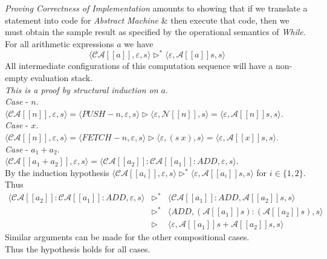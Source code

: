 \documentclass[11pt,a4paper]{article}
\begin{document}
\textit{Proving Correctness of Implementation} amounts to showing that if we translate a statement into code for \textit{Abstract Machine} \& then execute that code, then we must obtain the sample result as specified by the operational semantics of \textit{While}.\\

For all arithmetic expressions $a$ we have
$$\langle\mathcal{CA}[[a]],\varepsilon,s\rangle\rhd^*\langle\varepsilon,\mathcal{A}[[a]]s,s\rangle$$
\nb All intermediate configurations of this computation sequence will have a non-empty evaluation stack.\\

\textit{This is a proof by structural induction on $a$}.\\
\textit{Case} - $n$.\\
$\langle\mathcal{CA}[[n]],\varepsilon,s\rangle=\langle PUSH-n,\varepsilon,s\rangle\rhd\langle\varepsilon,\mathcal{N}[[n]],s\rangle=\langle\varepsilon,\mathcal{A}[[n]]s,s\rangle$.\\
\textit{Case} - $x$.\\
$\langle\mathcal{CA}[[n]],\varepsilon,s\rangle=\langle FETCH-n,\varepsilon,s\rangle\rhd\langle\varepsilon,(s\ x),s\rangle=\langle\varepsilon,\mathcal{A}[[x]]s,s\rangle$.\\
\textit{Case} - $a_1+a_2$.\\
$\langle\mathcal{CA}[[a_1+a_2]],\varepsilon,s\rangle=\langle\mathcal{CA}[[a_2]]:\mathcal{CA}[[a_1]]:ADD,\varepsilon,s\rangle$.\\
By the induction hypothesis
$\langle\mathcal{CA}[[a_i]],\varepsilon,s\rangle\rhd^*\langle\varepsilon,\mathcal{A}[[a_i]]s,s\rangle$ for $i\in\{1,2\}$.\\
Thus
\[\begin{array}{rcl}
\langle\mathcal{CA}[[a_2]]:\mathcal{CA}[[a_1]]:ADD,\varepsilon,s\rangle&\rhd^*&
\langle\mathcal{CA}[[a_1]]:ADD,\mathcal{A}[[a_2]]s,s\rangle\\
&\rhd^*&\langle ADD,(\mathcal{A}[[a_1]]s):(\mathcal{A}[[a_2]]s),s\rangle\\
&\rhd&\langle\varepsilon,\mathcal{A}[[a_1]]s+\mathcal{A}[[a_2]]s,s\rangle
\end{array}\]
Similar arguments can be made for the other compositional cases.\\
Thus the hypothesis holds for all cases.\\
\end{document}
